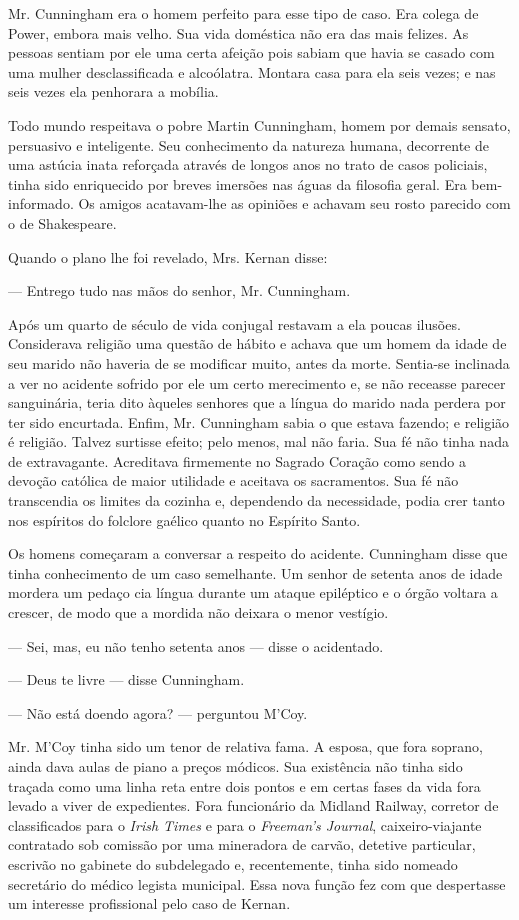 Mr. Cunningham era o homem perfeito para esse tipo de caso. Era colega
de Power, embora mais velho. Sua vida doméstica não
era das mais felizes. As pessoas sentiam por ele uma certa afeição
pois sabiam que havia se casado com uma mulher desclassificada e
alcoólatra. Montara casa para ela seis vezes; e nas seis vezes ela
penhorara a mobília.

Todo mundo respeitava o pobre Martin Cunningham, homem por demais
sensato, persuasivo e inteligente. Seu conhecimento da natureza
humana, decorrente de uma astúcia inata reforçada através de longos
anos no trato de casos policiais, tinha sido enriquecido por breves
imersões nas águas da filosofia geral. Era bem-informado. Os amigos
acatavam-lhe as opiniões e achavam seu rosto parecido com o de
Shakespeare.

Quando o plano lhe foi revelado, Mrs. Kernan disse:

--- Entrego tudo nas mãos do senhor, Mr. Cunningham.

Após um quarto de século de vida conjugal restavam a ela poucas
ilusões. Considerava religião uma questão de hábito e achava que um
homem da idade de seu marido não haveria de se modificar muito, antes
da morte. Sentia-se inclinada a ver no acidente sofrido por ele um
certo merecimento e, se não receasse parecer sanguinária, teria dito
àqueles senhores que a língua do marido nada perdera por ter sido
encurtada. Enfim, Mr. Cunningham sabia o que estava fazendo; e
religião é religião. Talvez surtisse efeito; pelo menos, mal não
faria. Sua fé não tinha nada de extravagante. Acreditava firmemente no
Sagrado Coração como sendo a devoção católica de maior utilidade e
aceitava os sacramentos. Sua fé não transcendia os limites da cozinha
e, dependendo da necessidade, podia crer tanto nos espíritos do
folclore gaélico quanto no Espírito Santo.

Os homens começaram a conversar a respeito do acidente. Cunningham
disse que tinha conhecimento de um caso semelhante. Um senhor de
setenta anos de idade mordera um pedaço cia língua durante um ataque
epiléptico e o órgão voltara a crescer, de modo que a mordida não
deixara o menor vestígio.

--- Sei, mas, eu não tenho setenta anos --- disse o acidentado.

--- Deus te livre --- disse Cunningham.

--- Não está doendo agora? --- perguntou M'Coy.

Mr. M'Coy tinha sido um tenor de relativa fama. A esposa, que fora
soprano, ainda dava aulas de piano a preços módicos. Sua
existência não tinha sido traçada como uma linha reta entre dois
pontos e em certas fases da vida fora levado a viver de expedientes.
Fora funcionário da Midland Railway, corretor de classificados para
o \textit{Irish Times} e para o \textit{Freeman's Journal}, caixeiro-viajante contratado
sob comissão por uma mineradora de carvão, detetive particular,
escrivão no gabinete do subdelegado e, recentemente, tinha sido
nomeado secretário do médico legista municipal. Essa nova função fez
com que despertasse um interesse profissional pelo caso de Kernan.

